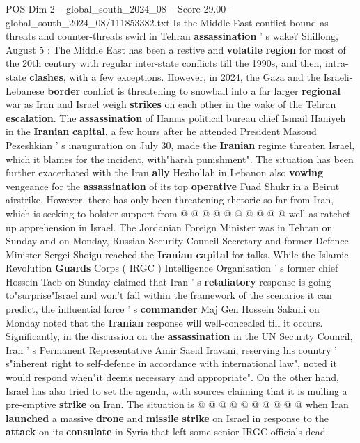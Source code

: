 \begin{textsample}{POS Dim 2 – global\_south\_2024\_08 – Score 29.00 – global\_south\_2024\_08/111853382.txt}  \label{ex:f2_pos_014}
Is the Middle East conflict-bound as threats and counter-threats swirl in Tehran \textbf{assassination} ' s wake?
Shillong, August 5 : The Middle East has been a restive and \textbf{volatile} \textbf{region} for most of the 20th century with regular inter-state conflicts till the 1990s, and then, intra-state \textbf{clashes}, with a few exceptions.
However, in 2024, the Gaza and the Israeli-Lebanese \textbf{border} conflict is threatening to snowball into a far larger \textbf{regional} war as Iran and Israel weigh \textbf{strikes} on each other in the wake of the Tehran \textbf{escalation}.
The \textbf{assassination} of Hamas political bureau chief Ismail Haniyeh in the \textbf{Iranian} \textbf{capital}, a few hours after he attended President Masoud Pezeshkian ' s inauguration on July 30, made the \textbf{Iranian} regime threaten Israel, which it blames for the incident, with"harsh punishment".
The situation has been further exacerbated with the Iran \textbf{ally} Hezbollah in Lebanon also \textbf{vowing} vengeance for the \textbf{assassination} of its top \textbf{operative} Fuad Shukr in a Beirut airstrike.
However, there has only been threatening rhetoric so far from Iran, which is seeking to bolster support from @ @ @ @ @ @ @ @ @ @ well as ratchet up apprehension in Israel.
The Jordanian Foreign Minister was in Tehran on Sunday and on Monday, Russian Security Council Secretary and former Defence Minister Sergei Shoigu reached the \textbf{Iranian} \textbf{capital} for talks.
While the Islamic Revolution \textbf{Guards} Corps ( IRGC ) Intelligence Organisation ' s former chief Hossein Taeb on Sunday claimed that Iran ' s \textbf{retaliatory} response is going to"surprise"Israel and won't fall within the framework of the scenarios it can predict, the influential force ' s \textbf{commander} Maj Gen Hossein Salami on Monday noted that the \textbf{Iranian} response will well-concealed till it occurs.
Significantly, in the discussion on the \textbf{assassination} in the UN Security Council, Iran ' s Permanent Representative Amir Saeid Iravani, reserving his country ' s"inherent right to self-defence in accordance with international law", noted it would respond when"it deems necessary and appropriate".
On the other hand, Israel has also tried to set the agenda, with sources claiming that it is mulling a pre-emptive \textbf{strike} on Iran.
The situation is @ @ @ @ @ @ @ @ @ @ when Iran \textbf{launched} a massive \textbf{drone} and \textbf{missile} \textbf{strike} on Israel in response to the \textbf{attack} on its \textbf{consulate} in Syria that left some senior IRGC officials dead.

\end{textsample}
